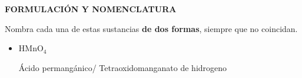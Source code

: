 \documentclass[answers,addpoints,14pt]{exam}
\newcommand*\chem[1]{\ensuremath{\mathrm{#1}}}
\newcommand{\halmos}{\vspace*{-4mm}
	
					\begin{flushright}
						\rule{1mm}{2.5mm} 
					\end{flushright}\vspace*{-4mm}
						
					  }
\renewcommand{\qed}{\halmos}
\begin{document}
\begin{questions}
%
%
%
%
%

\vspace*{3ex}



\begin{formulacion}
\textbf{FORMULACIÓN Y NOMENCLATURA}
\end{formulacion}


\begin{question}[4]
	Nombra cada una de estas sustancias \textbf{de dos formas}, siempre que no coincidan. 
	\begin{itemize}
		\item $\chem{HMnO_4}$
		\begin{mdframed}[backgroundcolor=brown!10]  
		Ácido permangánico/ Tetraoxidomanganato de hidrogeno
		\end{mdframed}
		
				

\end{itemize}
\end{question}
\end{questions}
\end{document}
